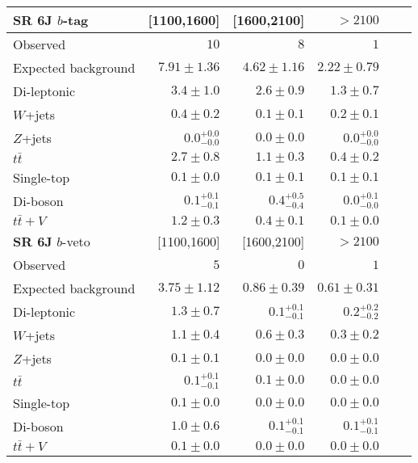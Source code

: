 \begin{tabular*}{\textwidth}{@{\extracolsep{\fill}}lrrrrr}
\toprule
\textbf{SR 6J} $b$-tag & [1100,1600] & [1600,2100] & $>2100$ \\
\midrule

Observed          & $10$              & $8$              & $1$                    \\
\midrule
Expected background         & $7.91 \pm 1.36$          & $4.62 \pm 1.16$          & $2.22 \pm 0.79$              \\
\midrule
        Di-leptonic         & $3.4 \pm 1.0$          & $2.6 \pm 0.9$          & $1.3 \pm 0.7$              \\
        $W$+jets         & $0.4 \pm 0.2$          & $0.1 \pm 0.1$          & $0.2 \pm 0.1$              \\
        $Z$+jets         & $0.0_{-0.0}^{+0.0}$          & $0.0 \pm 0.0$          & $0.0_{-0.0}^{+0.0}$              \\
        $t\bar{t}$         & $2.7 \pm 0.8$          & $1.1 \pm 0.3$          & $0.4 \pm 0.2$              \\
        Single-top         & $0.1 \pm 0.0$          & $0.1 \pm 0.1$          & $0.1 \pm 0.1$              \\
        Di-boson         & $0.1_{-0.1}^{+0.1}$          & $0.4_{-0.4}^{+0.5}$          & $0.0_{-0.0}^{+0.1}$              \\
        $t\bar{t}+V$         & $1.2 \pm 0.3$          & $0.4 \pm 0.1$          & $0.1 \pm 0.0$              \\
\toprule
\textbf{SR 6J} $b$-veto & [1100,1600] & [1600,2100] & $>2100$ \\
\midrule
Observed          & $5$              & $0$              & $1$                    \\
\midrule
Expected background         & $3.75 \pm 1.12$          & $0.86 \pm 0.39$          & $0.61 \pm 0.31$              \\
\midrule
        Di-leptonic         & $1.3 \pm 0.7$          & $0.1_{-0.1}^{+0.1}$          & $0.2_{-0.2}^{+0.2}$              \\
        $W$+jets         & $1.1 \pm 0.4$          & $0.6 \pm 0.3$          & $0.3 \pm 0.2$              \\
        $Z$+jets         & $0.1 \pm 0.1$          & $0.0 \pm 0.0$          & $0.0 \pm 0.0$              \\
        $t\bar{t}$         & $0.1_{-0.1}^{+0.1}$          & $0.1 \pm 0.0$          & $0.0 \pm 0.0$              \\
        Single-top         & $0.1 \pm 0.0$          & $0.0 \pm 0.0$          & $0.0 \pm 0.0$              \\
        Di-boson         & $1.0 \pm 0.6$          & $0.1_{-0.1}^{+0.1}$          & $0.1_{-0.1}^{+0.1}$              \\
        $t\bar{t}+V$         & $0.1 \pm 0.0$          & $0.0 \pm 0.0$          & $0.0 \pm 0.0$              \\


\bottomrule
\end{tabular*}




